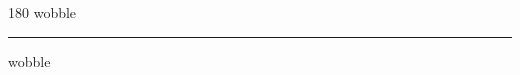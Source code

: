 
\begin{frame}
\begin{center}
\begin{turn}{180}
{\fontsize{2.5cm}{1em}\selectfont wobble}
\end{turn}
\vspace{1em}\par  
\hrule
\vspace{1em}\par  
{\fontsize{2.5cm}{1em}\selectfont wobble}
\end{center}
\end{frame}
